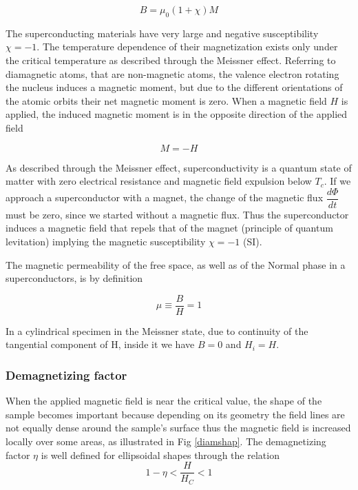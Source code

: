 \documentclass[openany,11pt,a4paper]{report}
\begin{document}
\begin{equation}
B= \mu_{0}(1+\chi) M
\end{equation}


The superconducting materials have very large and negative susceptibility $\chi=-1$. The temperature dependence of their magnetization exists only under the critical temperature as described  through the Meissner effect.
Referring to diamagnetic atoms, that are non-magnetic atoms, the valence electron rotating the nucleus induces a magnetic moment, but due to the different orientations of the atomic orbits their net magnetic moment is zero. When a magnetic field $H$ is applied, the induced magnetic moment is in the opposite direction of the applied field

\begin{equation}
M=-H
\end{equation}

As described through the Meissner effect, superconductivity is a quantum state of matter with zero electrical resistance and magnetic field expulsion below $T_{c}$. If we approach a superconductor with a magnet, the change of the magnetic flux $\dfrac{d\Phi}{dt}$ must be zero, since we started without a magnetic flux. Thus the superconductor induces a magnetic field that repels that of the magnet (principle of quantum levitation) implying the magnetic susceptibility $\chi=-1$ (SI).\

The magnetic permeability of the free space, as well as of the Normal phase in a superconductors, is by definition 

\begin{equation}
\mu \equiv \frac{B}{H}=1
\end{equation}

In a cylindrical specimen in the Meissner state, due
to continuity of the tangential component of H, inside it we have $B=0$ and $H_{i}=H$.



\subsubsection{Demagnetizing factor}
When the applied magnetic field is near the critical value, the shape of the sample becomes important because depending on its geometry the field lines are not equally dense around the sample's surface thus the magnetic field is increased locally over some areas, as illustrated in Fig \ref{diamshap}.
The demagnetizing factor $\eta$ is well defined for ellipsoidal shapes through the relation 
\begin{equation}
1- \eta < \dfrac{H}{H_{C}} <1
\end{equation}
\end{document}
